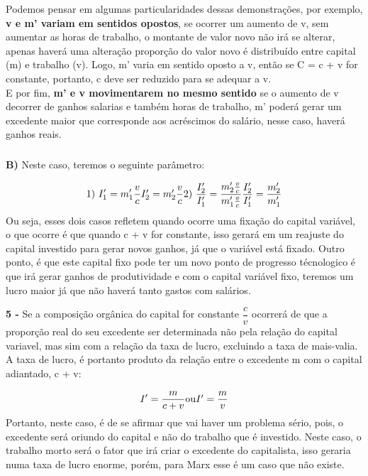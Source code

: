 \documentclass[a4paper, 12pt]{article} %
\begin{document}
Podemos pensar em algumas particularidades dessas demonstrações, por exemplo, \textbf{v e m' variam em sentidos opostos}, se  ocorrer um aumento de v, sem aumentar as horas de trabalho, o montante de valor novo não irá se alterar, apenas haverá uma alteração proporção do valor novo é distribuído entre capital (m) e trabalho (v). Logo, m' varia em sentido oposto a v, então se C = c + v for constante, portanto, c deve ser reduzido para se adequar a v.
\\
E por fim, \textbf{m' e v movimentarem no mesmo sentido} se o aumento de v decorrer de ganhos salarias e também horas de trabalho, m' poderá gerar um excedente maior que corresponde aos acréscimos do salário, nesse caso, haverá ganhos reais.

\subparagraph{} \textbf{B)} Neste caso, teremos o seguinte parâmetro:

\begin{equation}
1) \ I'_{1} = m'_{1}\dfrac{v}{c}
$$\\$$
I'_{2} = m'_{2}\dfrac{v}{c}
$$\\$$
2) \ \dfrac{I'_{2}}{I'_{1}} = \dfrac{m'_{2} \frac{v}{c}}{m'_{1}\frac{v}{c}}
$$\\$$
\dfrac{I'_{2}}{I'_{1}} = \dfrac{m'_{2}}{m'_{1}}
\end{equation}
Ou seja, esses dois casos refletem quando ocorre uma fixação do capital variável, o que ocorre é que quando c + v for constante, isso gerará em um reajuste do capital investido para gerar novos ganhos, já que o variável está fixado. Outro ponto, é que este capital fixo pode ter um novo ponto de progresso técnologico é que irá gerar ganhos de produtividade e com o capital variável fixo, teremos um lucro maior já que não haverá tanto gastos com salários.

\vspace{0.5cm}

\par \textbf{5 -} Se a composição orgânica do capital for constante $\dfrac{c}{v}$ ocorrerá de que a proporção real do seu excedente ser determinada não pela relação do capital variavel, mas sim com a relação da taxa de lucro, excluindo a taxa de mais-valia. A taxa de lucro, é portanto produto da relação entre o excedente m com o capital adiantado, c + v:

\begin{equation}
I' = \dfrac{m}{c + v} 
$$\\$$
\text{ou}
$$\\$$
I' = \dfrac{m}{v}
\end{equation}
Portanto, neste caso, é de se afirmar que vai haver um problema sério, pois, o excedente será oriundo do capital e não do trabalho que é investido. Neste caso, o trabalho morto será o fator que irá criar o excedente do capitalista, isso geraria numa taxa de lucro enorme, porém, para Marx esse é um caso que não existe.
\end{document}
